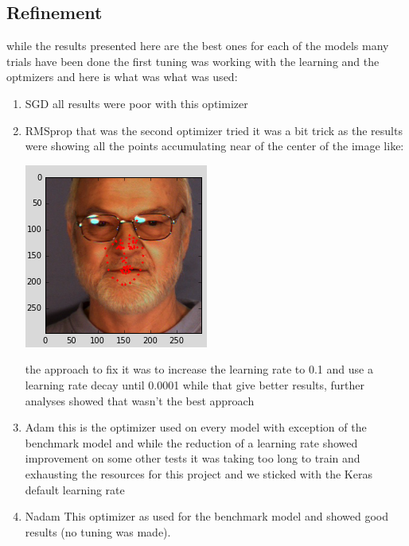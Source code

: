 \documentclass[11pt]{article}
\begin{document}
\subsection{Refinement}
\label{sec:orge10d028}
while the results presented here are the best ones for each of the models 
many trials have been done the first tuning was working with the learning
and the optmizers and here is what was what was used:
\begin{enumerate}
\item SGD
\label{sec:org11bccae}
all results were poor with this optimizer

\item RMSprop
\label{sec:org4ffee0c}
that was the second optimizer tried it was a bit trick as the results were
showing all the points accumulating near of the center of the image like:

\begin{center}
\includegraphics[width=.9\linewidth]{./images/RMSprop.png}
\end{center}

the approach to fix it was to increase the learning rate to 0.1 and use a
learning rate decay until 0.0001 while that give better results, further
analyses showed that wasn't the best approach

\item Adam
\label{sec:orgc942394}
this is the optimizer used on every model with exception of the benchmark
model and while the reduction of a learning rate showed improvement on some
other tests it was taking too long to train and exhausting the resources
for this project and we sticked with the Keras default learning rate

\item Nadam
\label{sec:orgbacaea0}
This optimizer as used for the benchmark model and showed good results (no
tuning was made).
\end{enumerate}
\end{document}
